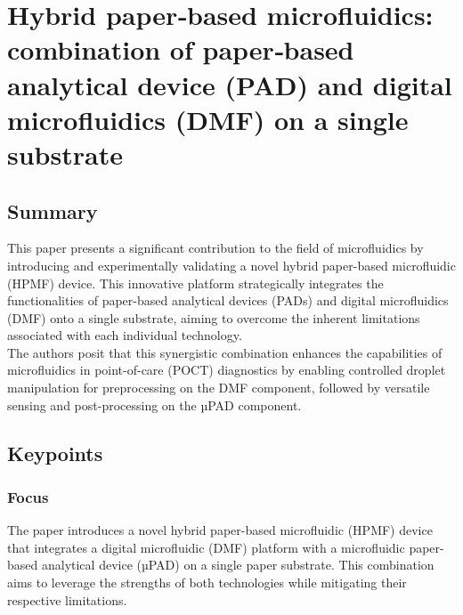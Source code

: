 \chapter[Hybrid paper‑based microfluidics]{Hybrid paper‑based microfluidics: combination of paper‑based analytical device (\textmugreek PAD) and digital microfluidics (DMF) on a single substrate}

\section{Summary}
This paper presents a significant contribution to the field of microfluidics by introducing and experimentally validating a novel hybrid paper-based microfluidic (HPMF) device. This innovative platform strategically integrates the functionalities of paper-based analytical devices (\textmugreek PADs) and digital microfluidics (DMF) onto a single substrate, aiming to overcome the inherent limitations associated with each individual technology.\\

The authors posit that this synergistic combination enhances the capabilities of microfluidics in point-of-care (POCT) diagnostics by enabling controlled droplet manipulation for preprocessing on the DMF component, followed by versatile sensing and post-processing on the µPAD component.

\section{Keypoints}
\subsection{Focus}
The paper introduces a novel hybrid paper-based microfluidic (HPMF) device that integrates a digital microfluidic (DMF) platform with a microfluidic paper-based analytical device (µPAD) on a single paper substrate. This combination aims to leverage the strengths of both technologies while mitigating their respective limitations. \newpage

